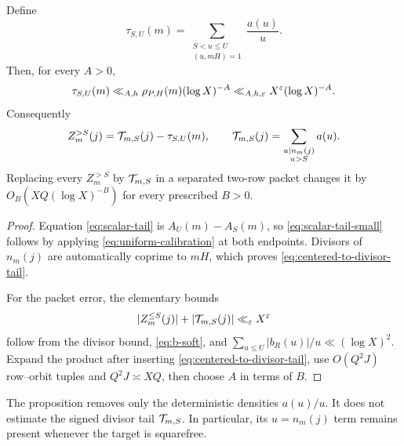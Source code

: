 \begin{proposition}
\label{prop:scalar-tail}
Define
\begin{equation}
 \tau_{S,U}(m)=
 \sum_{\substack{S<u\le U\\(u,mH)=1}}\frac{a(u)}u.
 \label{eq:scalar-tail}
\end{equation}
Then, for every \(A>0\),
\begin{equation}
 \tau_{S,U}(m)
 \ll_{A,h}\rho_{P,H}(m)(\log X)^{-A}
 \ll_{A,h,\varepsilon}X^\varepsilon(\log X)^{-A}.
 \label{eq:scalar-tail-small}
\end{equation}
Consequently
\begin{equation}
 Z_m^{>S}(j)=\mathcal T_{m,S}(j)-\tau_{S,U}(m),
 \qquad
 \mathcal T_{m,S}(j)=\sum_{\substack{u\mid n_m(j)\\u>S}}a(u).
 \label{eq:centered-to-divisor-tail}
\end{equation}
Replacing every \(Z_m^{>S}\) by \(\mathcal T_{m,S}\) in a separated two-row
packet changes it by \(O_B(XQ(\log X)^{-B})\) for every prescribed
\(B>0\).
\end{proposition}

\begin{proof}
Equation \eqref{eq:scalar-tail} is \(A_U(m)-A_S(m)\), so
\eqref{eq:scalar-tail-small} follows by applying
\eqref{eq:uniform-calibration} at both endpoints.  Divisors of
\(n_m(j)\) are automatically coprime to \(mH\), which proves
\eqref{eq:centered-to-divisor-tail}.

For the packet error, the elementary bounds
\begin{equation}
 |Z_m^{\le S}(j)|+|\mathcal T_{m,S}(j)|
 \ll_\varepsilon X^\varepsilon
 \label{eq:pointwise-signals}
\end{equation}
follow from the divisor bound, \eqref{eq:b-soft}, and
\(\sum_{u\le U}|b_R(u)|/u\ll(\log X)^2\).  Expand the product after
inserting \eqref{eq:centered-to-divisor-tail}, use \(O(Q^2J)\) row--orbit
tuples and \(Q^2J\asymp XQ\), then choose \(A\) in terms of \(B\).
\end{proof}

\begin{remark}
\label{rem:calibration-not-parity}
The proposition removes only the deterministic densities \(a(u)/u\).
It does not estimate the signed divisor tail \(\mathcal T_{m,S}\).  In
particular, its \(u=n_m(j)\) term remains present whenever the target is
squarefree.
\end{remark}
